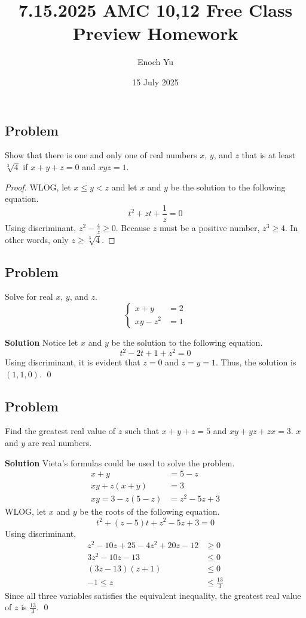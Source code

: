 \documentclass{article}
\title{7.15.2025 AMC 10,12 Free Class Preview Homework}
\author{Enoch Yu}
\date{15 July 2025}
\newenvironment{solution}{\begin{trivlist}\item[]{\bf Solution}}{\qed \end{trivlist}}
\begin{document}
\maketitle

\subsection*{Problem}
Show that there is one and only one of real numbers
$x$, $y$, and $z$ that is at least $\sqrt[3]{4}$ if
$x + y + z = 0$ and $xyz = 1$.

\begin{proof}
WLOG, let $x \leq y < z$ and let $x$ and $y$ be the
solution to the following equation.
\[
t^2 + zt + \frac{1}{z} = 0
\]
Using discriminant, $z^2 - \frac{4}{z} \geq 0$.
Because $z$ must be a positive number, $z^3 \geq 4$.
In other words, only $z \geq \sqrt[3]{4}$.
\end{proof}

\subsection*{Problem}
Solve for real $x$, $y$, and $z$.
\[
\begin{cases}
    x + y &= 2 \\
    xy - z^2 &= 1
\end{cases}
\]
\begin{solution}
Notice let $x$ and $y$ be the solution to the
following equation.
\[
t^2 - 2t + 1 + z^2 = 0
\]
Using discriminant, it is evident that $z = 0$ and
$z = y = 1$. Thus, the solution is $\boxed{(1, 1, 0)}$.
\end{solution}

\subsection*{Problem}
Find the greatest real value of $z$ such that
$x + y + z = 5$ and $xy + yz + zx = 3$. $x$ and
$y$ are real numbers.
\begin{solution}
Vieta's formulas could be used to solve the problem.
\begin{align*}
    x + y &= 5 - z \\
    xy + z(x + y) &= 3 \\
    xy = 3 - z(5 - z) &= z^2 - 5z + 3
\end{align*}
WLOG, let $x$ and $y$ be the roots of the following equation.
\[
t^2 + (z - 5)t + z^2 - 5z + 3 = 0
\]
Using discriminant,
\begin{align*}
    z^2 - 10 z + 25 - 4z^2 + 20z - 12 &\geq 0 \\
    3z^2 - 10z - 13 &\leq 0 \\
    (3z - 13)(z + 1) &\leq 0 \\
    -1 \leq z &\leq \frac{13}{3}
\end{align*}
Since all three variables satisfies the equivalent
inequality, the greatest real value of $z$ is
$\boxed{\frac{13}{3}}$.
\end{solution}
\end{document}
